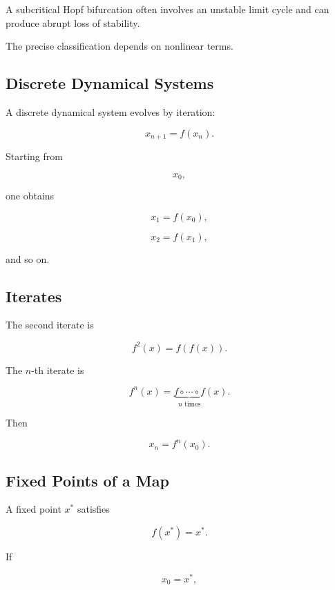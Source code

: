 A subcritical Hopf bifurcation often involves an unstable limit cycle and
can produce abrupt loss of stability.

The precise classification depends on nonlinear terms.

\subsection{Discrete Dynamical Systems}
\label{subsec:discrete-dynamical-systems}

A discrete dynamical system evolves by iteration:

\[
\boxed{
x_{n+1}
=
f(x_n).
}
\]

Starting from

\[
x_0,
\]

one obtains

\[
x_1=f(x_0),
\]

\[
x_2=f(x_1),
\]

and so on.

\subsection{Iterates}
\label{subsec:dynamical-iterates}

The second iterate is

\[
\boxed{
f^2(x)
=
f(f(x)).
}
\]

The \(n\)-th iterate is

\[
\boxed{
f^n(x)
=
\underbrace{
f\circ\cdots\circ f
}_{n\text{ times}}
(x).
}
\]

Then

\[
\boxed{
x_n
=
f^n(x_0).
}
\]

\subsection{Fixed Points of a Map}
\label{subsec:fixed-points-map}

A fixed point \(x^*\) satisfies

\[
\boxed{
f(x^*)=x^*.
}
\]

If

\[
x_0=x^*,
\]

